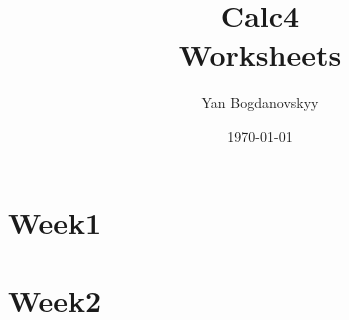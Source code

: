 \documentclass{report}
\title{\Huge{Calc4}\\ Worksheets}
\author{\huge{Yan Bogdanovskyy}}
\date{\today}
\begin{document}
\maketitle
\tableofcontents
\pagebreak

\chapter{Week1}


\chapter{Week2}

\end{document}
